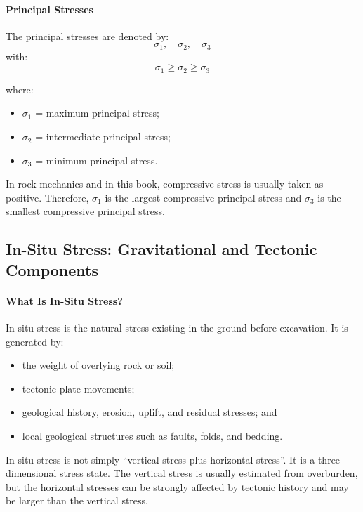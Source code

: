 \paragraph{Principal Stresses}

The principal stresses are denoted by:
\[
\sigma_1,\quad \sigma_2,\quad \sigma_3
\]
with:
\[
\sigma_1 \geq \sigma_2 \geq \sigma_3
\]

where:
\begin{itemize}
 \item \(\sigma_1\) = maximum principal stress;
 \item \(\sigma_2\) = intermediate principal stress;
 \item \(\sigma_3\) = minimum principal stress.
\end{itemize}

\begin{keybox}
In rock mechanics and in this book, compressive stress is usually taken as positive.
Therefore, \(\sigma_1\) is the largest compressive principal stress and \(\sigma_3\) is the
smallest compressive principal stress.
\end{keybox}

\subsection{In-Situ Stress: Gravitational and Tectonic Components}

\paragraph{What Is In-Situ Stress?}

In-situ stress is the natural stress existing in the ground before excavation. It is generated
by:
\begin{itemize}
 \item the weight of overlying rock or soil;
 \item tectonic plate movements;
 \item geological history, erosion, uplift, and residual stresses; and
 \item local geological structures such as faults, folds, and bedding.
\end{itemize}

\begin{warnbox}
In-situ stress is not simply ``vertical stress plus horizontal stress''. It is a
three-dimensional stress state. The vertical stress is usually estimated from overburden,
but the horizontal stresses can be strongly affected by tectonic history and may be larger
than the vertical stress.
\end{warnbox}

